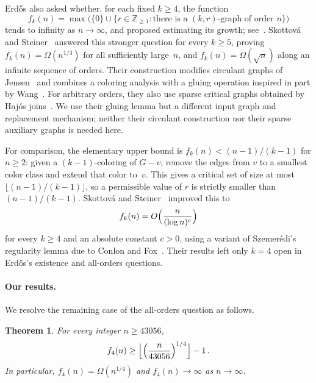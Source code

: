 \documentclass[11pt,letterpaper]{article}
\numberwithin{equation}{section}
\theoremstyle{plain}
\newtheorem{mainthm}{Theorem}
\theoremstyle{definition}
\theoremstyle{remark}
\newcommand{\Z}{\mathbb{Z}}
\begin{document}
Erd\H{o}s also asked whether, for each fixed $k\ge 4$, the function
\begin{equation*}
  f_k(n)=\max\bigl(\{0\}\cup\{r\in\Z_{\ge 1}: \text{there is a $(k,r)$-graph of order $n$}\}\bigr)
\end{equation*}
tends to infinity as $n\to\infty$, and proposed estimating its growth; see~\cite{Erdos1989,ChungGraham,ChungOnline}. Skottov\'a and Steiner~\cite{SkottovaSteiner} answered this stronger question for every $k\ge 5$, proving $f_k(n)=\Omega(n^{1/3})$ for all sufficiently large~$n$, and $f_k(n)=\Omega(\sqrt n)$ along an infinite sequence of orders. Their construction modifies circulant graphs of Jensen~\cite{Jensen2002} and combines a coloring analysis with a gluing operation inspired in part by Wang~\cite{Wang}. For arbitrary orders, they also use sparse critical graphs obtained by Haj\'os joins~\cite{Hajos}. We use their gluing lemma but a different input graph and replacement mechanism; neither their circulant construction nor their sparse auxiliary graphs is needed here.

For comparison, the elementary upper bound is $f_k(n)<(n-1)/(k-1)$ for $n\ge 2$: given a $(k-1)$-coloring of $G-v$, remove the edges from $v$ to a smallest color class and extend that color to~$v$. This gives a critical set of size at most $\lfloor (n-1)/(k-1)\rfloor$, so a permissible value of $r$ is strictly smaller than $(n-1)/(k-1)$. Skottov\'a and Steiner~\cite{SkottovaSteiner} improved this to
\begin{equation*}
  f_k(n)=O\Bigl(\frac{n}{(\log n)^{c}}\Bigr)
\end{equation*}
for every $k\ge 4$ and an absolute constant $c>0$, using a variant of Szemer\'edi's regularity lemma due to Conlon and Fox~\cite{ConlonFox}. Their results left only $k=4$ open in Erd\H{o}s's existence and all-orders questions.

\paragraph{Our results.}
We resolve the remaining case of the all-orders question as follows.

\begin{mainthm}\label{thm:main}
For every integer $n\ge 43056$,
\begin{equation*}
  f_4(n)\ge\Bigl\lfloor \Bigl(\frac{n}{43056}\Bigr)^{1/4}\Bigr\rfloor-1\,.
\end{equation*}
In particular, $f_4(n)=\Omega(n^{1/4})$ and $f_4(n)\to\infty$ as $n\to\infty$.
\end{mainthm}
\end{document}
